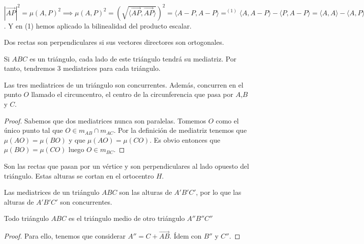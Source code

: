 \begin{nota}
  $|\vec{AP}|^2 = \mu(A,P)^2\implies \mu(A,P)^2 = 	\left(\sqrt{\langle \vec{AP},\vec{AP}\rangle }\right)^2 =  \langle A-P, A-P \rangle  =^{(1)} \langle A,A-P\rangle -\langle P,A-P\rangle  =  \langle A,A\rangle  - \langle A,P\rangle +\langle P,P\rangle - \langle P,A\rangle   = |A|^2+|P|^2-2 \langle P,A\rangle $. Y en (1) hemos aplicado la bilinealidad del producto escalar.
\end{nota}
\begin{ndef}
  Dos rectas son perpendiculares si sus vectores directores son ortogonales.
\end{ndef}

\begin{ndef}
  Si $ABC$ es un triángulo, cada lado de este triángulo tendrá su mediatriz. Por tanto, tendremos 3 mediatrices para cada triángulo.
\end{ndef}

\begin{nth}
  Las tres mediatrices de un triángulo son concurrentes. Además, concurren en el punto $O$ llamado el circuncentro, el centro de la circunferencia que pasa por $A$,$B$ y $C$.
\end{nth}
\begin{proof}
  Sabemos que dos mediatrices nunca son paralelas. Tomemos $O$ como el único punto tal que $O \in  m_{AB} \cap m_{AC}$. Por la definición de mediatriz tenemos que $\mu(AO) = \mu(BO)$ y que $\mu(AO) = \mu(CO)$. Es obvio entonces que $\mu(BO) = \mu(CO)$ luego $O \in m_{BC}$.

\end{proof}

\begin{ndef}
  Son las rectas que pasan por un vértice y son perpendiculares al lado opuesto del triángulo. Estas alturas se cortan en el ortocentro $H$.
\end{ndef}

\begin{nota}
  Las mediatrices de un triángulo $ABC$ son las alturas de $A'B'C'$, por lo que las alturas de $A'B'C'$ son concurrentes.
\end{nota}

\begin{nprop}
  Todo triángulo $ABC$ es el triángulo medio de otro triángulo $A''B''C''$
\end{nprop}
\begin{proof}
  Para ello, tenemos que considerar $A'' = C+ \vec{AB}$. Ídem con $B''$ y $C''$.
\end{proof}

